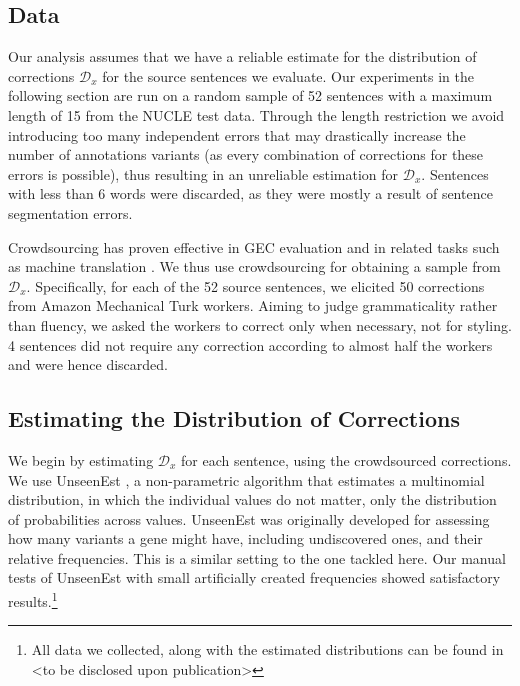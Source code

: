 \documentclass[letterpaper, 11pt]{article}
\begin{document}
 \subsection{Data}
%
Our analysis assumes that we have a reliable estimate for the distribution of corrections
$\mathcal{D}_x$ for the source sentences we evaluate.
Our experiments in the following section are run on a random sample of 52 sentences with a
maximum length of 15 from the NUCLE test data.
Through the length restriction we avoid introducing too many independent
errors that may drastically increase the number of annotations variants (as every combination of corrections for these errors is possible), thus resulting in an unreliable estimation for $\mathcal{D}_x$.
Sentences with less than 6 words were discarded, as they were mostly a result of sentence segmentation errors.

Crowdsourcing has proven effective in GEC evaluation \cite{madnani2011they,napoles2015ground} and in
related tasks such as machine translation \cite{zaidan2011crowdsourcing,post2012constructing}. We thus
use crowdsourcing for obtaining a sample from $\mathcal{D}_x$. Specifically, for each of the 52 source
sentences, we elicited 50 corrections from Amazon Mechanical Turk workers.
Aiming to judge grammaticality rather than fluency, we asked the workers to
correct only when necessary, not for styling.
4 sentences did not require any correction according to almost half the workers and were hence discarded.
%
\subsection{Estimating the Distribution of Corrections}\label{subsec:corrections_distribution}
%
We begin by estimating $\mathcal{D}_x$ for each sentence, using the crowdsourced corrections.
We use {\sc UnseenEst} \cite{zou2015quantifying}, a non-parametric algorithm that
estimates a multinomial distribution,
in which the individual values do not matter, only the distribution of probabilities
across values.%
{\sc UnseenEst} was originally developed for assessing how many
variants a gene might have, including undiscovered ones,
and their relative frequencies.
This is a similar setting to the one tackled here.
Our manual tests of {\sc UnseenEst} with small artificially created frequencies
showed satisfactory results.\footnote{All data we collected, along with the estimated
  distributions can be found in <to be disclosed upon publication>}
\end{document}
